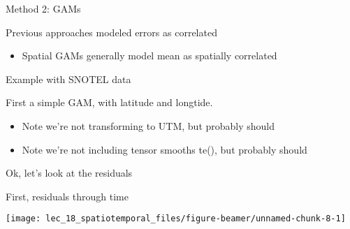 \documentclass[ignorenonframetext,]{beamer}
\newenvironment{Shaded}{\begin{snugshade}}{\end{snugshade}}
\newcommand{\DataTypeTok}[1]{\textcolor[rgb]{0.13,0.29,0.53}{#1}}
\newcommand{\KeywordTok}[1]{\textcolor[rgb]{0.13,0.29,0.53}{\textbf{#1}}}
\newcommand{\NormalTok}[1]{#1}
\newcommand{\OperatorTok}[1]{\textcolor[rgb]{0.81,0.36,0.00}{\textbf{#1}}}
\newcommand{\StringTok}[1]{\textcolor[rgb]{0.31,0.60,0.02}{#1}}
\providecommand{\tightlist}{%
  \setlength{\itemsep}{0pt}\setlength{\parskip}{0pt}}
\begin{document}
\begin{frame}{Method 2: GAMs}
\protect\hypertarget{method-2-gams}{}

Previous approaches modeled errors as correlated

\begin{itemize}
\tightlist
\item
  Spatial GAMs generally model mean as spatially correlated
\end{itemize}

\end{frame}

\begin{frame}[fragile]{Example with SNOTEL data}
\protect\hypertarget{example-with-snotel-data}{}

First a simple GAM, with latitude and longtide.

\begin{itemize}
\tightlist
\item
  Note we're not transforming to UTM, but probably should
\item
  Note we're not including tensor smooths te(), but probably should
\end{itemize}

\begin{Shaded}
\end{Shaded}

\end{frame}

\begin{frame}{Ok, let's look at the residuals}
\protect\hypertarget{ok-lets-look-at-the-residuals}{}

First, residuals through time

\begin{center}\texttt{[image: lec\_18\_spatiotemporal\_files/figure-beamer/unnamed-chunk-8-1]} \end{center}

\end{frame}
\end{document}
